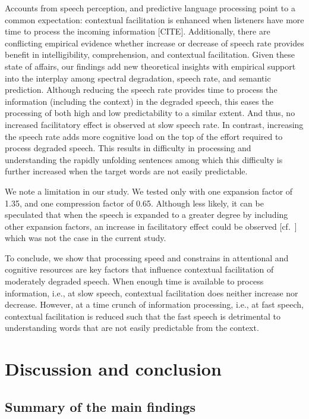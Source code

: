 \documentclass[a4paper, nobind]{templates/ociamthesis}
\begin{document}
Accounts from speech perception, and predictive language processing point to a common expectation: contextual facilitation is enhanced when listeners have more time to process the incoming information {[}CITE{]}.
Additionally, there are conflicting empirical evidence whether increase or decrease of speech rate provides benefit in intelligibility, comprehension, and contextual facilitation.
Given these state of affairs, our findings add new theoretical insights with empirical support into the interplay among spectral degradation, speech rate, and semantic prediction.
Although reducing the speech rate provides time to process the information (including the context) in the degraded speech, this eases the processing of both high and low predictability to a similar extent.
And thus, no increased facilitatory effect is observed at slow speech rate. In contrast, increasing the speech rate adds more cognitive load on the top of the effort required to process degraded speech.
This results in difficulty in processing and understanding the rapidly unfolding sentences among which this difficulty is further increased when the target words are not easily predictable.

We note a limitation in our study. We tested only with one expansion factor of 1.35, and one compression factor of 0.65.
Although less likely, it can be speculated that when the speech is expanded to a greater degree by including other expansion factors, an increase in facilitatory effect could be observed {[}cf.~{]} which was not the case in the current study.

To conclude, we show that processing speed and constrains in attentional and cognitive resources are key factors that influence contextual facilitation of moderately degraded speech.
When enough time is available to process information, i.e., at slow speech, contextual facilitation does neither increase nor decrease.
However, at a time crunch of information processing, i.e., at fast speech, contextual facilitation is reduced such that the fast speech is detrimental to understanding words that are not easily predictable from the context.

\hypertarget{chapter-conclusion}{%
\chapter{Discussion and conclusion}\label{chapter-conclusion}}

\hypertarget{summary-of-the-main-findings}{%
\section{Summary of the main findings}\label{summary-of-the-main-findings}}
\end{document}
